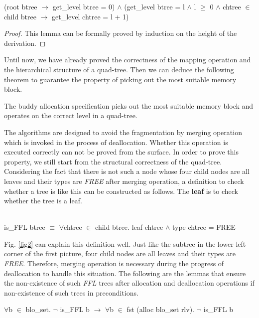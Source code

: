 \begin{lemma}
	(root btree $\longrightarrow$ get\_level btree = 0) $\wedge$ (get\_level btree = l $\wedge$ l $\geq$ 0 $\wedge$ chtree $\in$ child btree $\longrightarrow$ get\_level chtree = l + 1)
\end{lemma}

\begin{proof}
	This lemma can be formally proved by induction on the height of the derivation.
\end{proof}

Until now, we have already proved the correctness of the mapping operation and the hierarchical structure of a quad-tree. Then we can deduce the following theorem to guarantee the property of picking out the most suitable memory block.

\begin{theorem}
	The buddy allocation specification picks out the most suitable memory block and operates on the correct level in a quad-tree.
\end{theorem}

The algorithms are designed to avoid the fragmentation by merging operation which is invoked in the process of deallocation. Whether this operation is executed correctly can not be proved from the surface. In order to prove this property, we still start from the structural correctness of the quad-tree. Considering the fact that there is not such a node whose four child nodes are all leaves and their types are \emph{FREE} after merging operation, a definition to check whether a tree is like this can be constructed as follows. The \textbf{leaf} is to check whether the tree is a leaf.

\begin{definition}  \\
	is\_FFL btree $\equiv$ $\forall$chtree $\in$ child btree. leaf chtree $\wedge$ type chtree = FREE
\end{definition}

Fig. \ref{fig2} can explain this definition well. Just like the subtree in the lower left corner of the first picture, four child nodes are all leaves and their types are \emph{FREE}. Therefore, merging operation is necessary during the progress of deallocation to handle this situation. The following are the lemmas that ensure the non-existence of such \emph{FFL} trees after allocation and deallocation operations if non-existence of such trees in preconditions.

\begin{lemma}
	$\forall$b $\in$ blo\_set. $\neg$ is\_FFL b $\longrightarrow$ $\forall$b $\in$ fst (alloc blo\_set rlv). $\neg$ is\_FFL b
\end{lemma}

